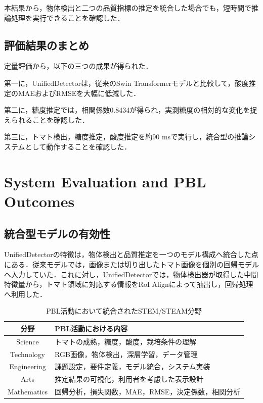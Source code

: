 \documentclass[authorproof,JRM,paper]{fujipressarticle}
\begin{document}
本結果から，物体検出と二つの品質指標の推定を統合した場合でも，短時間で推論処理を実行できることを確認した．

\subsection{評価結果のまとめ}

定量評価から，以下の三つの成果が得られた．

第一に，UnifiedDetectorは，従来のSwin Transformerモデルと比較して，酸度推定のMAEおよびRMSEを大幅に低減した．

第二に，糖度推定では，相関係数0.8434が得られ，実測糖度の相対的な変化を捉えられることを確認した．

第三に，トマト検出，糖度推定，酸度推定を約90 msで実行し，統合型の推論システムとして動作することを確認した．

\section{System Evaluation and PBL Outcomes}
\subsection{統合型モデルの有効性}
UnifiedDetectorの特徴は，物体検出と品質推定を一つのモデル構成へ統合した点にある．従来モデルでは，画像または切り出したトマト画像を個別の回帰モデルへ入力していた．これに対し，UnifiedDetectorでは，物体検出器が取得した中間特徴量から，トマト領域に対応する情報をRoI Alignによって抽出し，回帰処理へ利用した．

\begin{table}[t]
	\begin{center}
		\caption{PBL活動において統合されたSTEM/STEAM分野}
		\label{tab:stem_fields}
		\renewcommand{\arraystretch}{1.5}
		\begin{tabular}{|c|l|}
			\hline
			\textbf{分野} & \textbf{PBL活動における内容} \\ \hline
			Science & トマトの成熟，糖度，酸度，栽培条件の理解 \\ \hline
			Technology & RGB画像，物体検出，深層学習，データ管理 \\ \hline
			Engineering & 課題設定，要件定義，モデル統合，システム実装 \\ \hline
			Arts & 推定結果の可視化，利用者を考慮した表示設計 \\ \hline
			Mathematics & 回帰分析，損失関数，MAE，RMSE，決定係数，相関分析 \\ \hline
		\end{tabular}
	\end{center}
\end{table}
\end{document}
